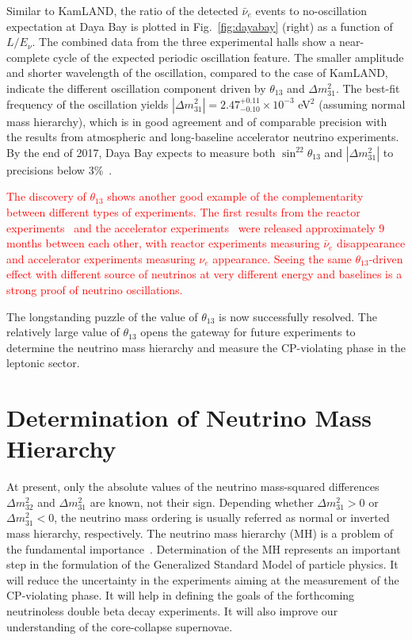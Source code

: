 \documentclass[aps,twocolumn,preprintnumbers,amsmath,superscriptaddress,amssymb,floats,nofootinbib]{revtex4-1}
\begin{document}
Similar to KamLAND, the ratio of the detected $\bar\nu_{e}$ events to no-oscillation expectation at Daya Bay is plotted in Fig.~\ref{fig:dayabay} (right) as a function of $L/E_{\nu}$. 
The combined data from the three experimental halls show a near-complete cycle of the expected periodic oscillation feature. 
The smaller amplitude and shorter wavelength of the oscillation, compared to the case of KamLAND, indicate the different oscillation component driven by $\theta_{13}$ and $\Delta{m}^2_{31}$. 
The best-fit frequency of the oscillation yields $|\Delta{m}^2_{31}| = 2.47^{+0.11}_{-0.10} \times 10^{-3}$ eV$^2$ (assuming normal mass hierarchy), which is in good agreement and of comparable precision with the results from atmospheric and long-baseline accelerator neutrino experiments. 
By the end of 2017, Daya Bay expects to measure both $\sin^22\theta_{13}$ and $|\Delta{m}^2_{31}|$ to precisions below 3\%~\cite{Zhang-Neutrino14}.

\textcolor{red}{The discovery of $\theta_{13}$ shows another good example of the complementarity between different types of experiments. The first results from the reactor experiments~\cite{DChooz,Dayabay,Reno} and the accelerator experiments~\cite{T2K2011,MINOS2011} were released approximately 9 months between each other, with reactor experiments measuring $\bar\nu_e$ disappearance and accelerator experiments measuring $\nu_e$ appearance. Seeing the same $\theta_{13}$-driven effect with different source of neutrinos at very different energy and baselines is a strong proof of neutrino oscillations.}

The longstanding puzzle of the value of $\theta_{13}$ is now successfully resolved.
The relatively large value of $\theta_{13}$ opens the gateway for future experiments to determine the neutrino mass hierarchy and measure the CP-violating phase in the leptonic sector.


\section{Determination of Neutrino Mass Hierarchy}

At present, only the absolute values of the neutrino mass-squared differences $\Delta m^2_{32}$ and $\Delta m^2_{31}$ are known, not their sign. 
Depending whether $\Delta m^2_{31}>0$ or $\Delta m^2_{31}<0$, the neutrino mass ordering is usually referred as normal or inverted mass hierarchy, respectively. 
The neutrino mass hierarchy (MH) is a problem of the fundamental importance~\cite{MHwhitepaper}.
Determination of the MH represents an important step in the formulation of the Generalized Standard Model of particle physics. 
It will reduce the uncertainty in the experiments aiming at the measurement of the CP-violating phase. 
It will help in defining the goals of the forthcoming neutrinoless double beta decay experiments.
It will also improve our understanding of the core-collapse supernovae.
\end{document}
